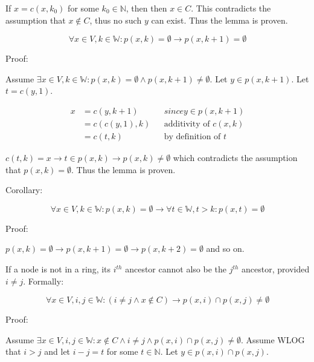 \documentclass[11pt]{article}
\begin{document}
    If $x=c(x,k_{0})$ for some $k_{0} \in \mathbb{N}$, then then $x \in C$. This contradicts the assumption that $x \notin C$, thus no such $y$ can exist. Thus the lemma is proven.

    \begin{equation}
        \forall x \in V,k \in \mathbb{W}: p(x,k) = \emptyset \rightarrow p(x,k+1) = \emptyset
    \end{equation}

    Proof:

    Assume $\exists x \in V, k \in \mathbb{W}: p(x,k)= \emptyset \land p(x,k+1) \not = \emptyset$. Let $y \in p(x,k+1)$. Let $t=c(y,1)$.

    \begin{align*}
        \text{$x$} &= \text{$c(y,k+1)$} && \text{$since y \in p(x,k+1)$} \\
        &= \text{$c(c(y,1),k)$} && \text{additivity of $c(x,k)$} \\
        &= \text{$c(t,k)$} && \text{by definition of $t$}
    \end{align*}

    $c(t,k) = x \rightarrow t \in p(x,k) \rightarrow p(x,k) \not = \emptyset$ which contradicts the assumption that $p(x,k) = \emptyset$. Thus the lemma is proven.

    Corollary:

    \begin{equation}
        \forall x \in V,k \in \mathbb{W}: p(x,k) = \emptyset \rightarrow \forall t \in \mathbb{W}, t>k: p(x,t) = \emptyset
    \end{equation}

    Proof:

    $p(x,k) = \emptyset \rightarrow p(x,k+1) = \emptyset \rightarrow p(x,k+2) = \emptyset$ and so on.

    If a node is not in a ring, its $i^{th}$ ancestor cannot also be the $j^{th}$ ancestor, provided $i\not = j$. Formally:

    \begin{equation}
        \forall x \in V, i,j \in \mathbb{W}: (i \not = j \land x \not \in C) \rightarrow p(x,i) \cap p(x,j) \not = \emptyset
    \end{equation}

    Proof:

    Assume $\exists x \in V, i,j \in \mathbb{W}: x \not \in C \land i\not = j\land p(x,i) \cap p(x,j) \not = \emptyset$. Assume WLOG that $i>j$ and let $i-j=t$ for some $t \in \mathbb{N}$. Let $y \in p(x,i) \cap p(x,j)$.
\end{document}
